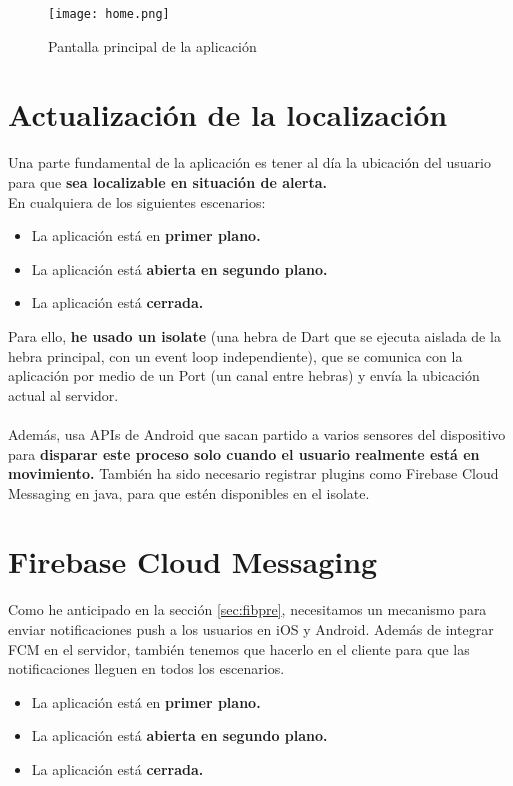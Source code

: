 \begin{figure}[H]
	\centering	
	\texttt{[image: home.png]}
	\caption{Pantalla principal de la aplicación}
	\end{figure}

\section{Actualización de la localización}
Una parte fundamental de la aplicación es tener al día la ubicación del usuario para que \textbf{sea localizable en situación de alerta.} \\

En cualquiera de los siguientes escenarios:
\begin{itemize}
	\item La aplicación está en \textbf{primer plano.}
	\item La aplicación está \textbf{abierta en segundo plano.}
	\item La aplicación está \textbf{cerrada.}
\end{itemize}

Para ello, \textbf{he usado un isolate} (una hebra de Dart que se ejecuta aislada de la hebra principal, con un event loop independiente), que se comunica con la aplicación por medio de un Port (un canal entre hebras) y envía la ubicación actual al servidor. \\ \\
Además, usa APIs de Android que sacan partido a varios sensores del dispositivo para \textbf{disparar este 
proceso solo cuando el usuario realmente está en movimiento.}
También ha sido necesario registrar plugins como Firebase Cloud Messaging en java, para que estén disponibles en el isolate.

\section{Firebase Cloud Messaging}\label{sec:fib}
Como he anticipado en la sección \ref{sec:fibpre}, necesitamos un mecanismo para enviar notificaciones push a los usuarios en iOS y Android.
Además de integrar FCM en el servidor, también tenemos que hacerlo en el cliente para que las notificaciones lleguen en todos los escenarios.

\begin{itemize}
	\item La aplicación está en \textbf{primer plano.}
	\item La aplicación está \textbf{abierta en segundo plano.}
	\item La aplicación está \textbf{cerrada.}
\end{itemize}



